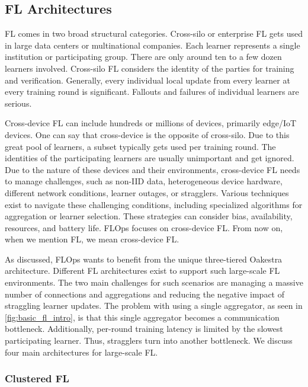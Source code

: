 \subsection{FL Architectures}

FL comes in two broad structural categories.
Cross-silo or enterprise FL gets used in large data centers or multinational companies.
Each learner represents a single institution or participating group.
There are only around ten to a few dozen learners involved.
Cross-silo FL considers the identity of the parties for training and verification.
Generally, every individual local update from every learner at every training round is significant.
Fallouts and failures of individual learners are serious.

Cross-device FL can include hundreds or millions of devices, primarily edge/IoT devices.
One can say that cross-device is the opposite of cross-silo.
Due to this great pool of learners, a subset typically gets used per training round.
The identities of the participating learners are usually unimportant and get ignored.
Due to the nature of these devices and their environments, cross-device FL
needs to manage challenges, such as non-IID data, heterogeneous device hardware,
different network conditions, learner outages, or stragglers.
Various techniques exist to navigate these challenging conditions,
including specialized algorithms for aggregation or learner selection.
These strategies can consider bias, availability, resources, and battery life.
FLOps focuses on cross-device FL.
From now on, when we mention FL, we mean cross-device FL.

As discussed, FLOps wants to benefit from the unique three-tiered Oakestra \cite{paper:oakestra_usenix} architecture.
Different FL architectures exist to support such large-scale FL environments.
The two main challenges for such scenarios are managing a massive number of connections and aggregations
and reducing the negative impact of straggling learner updates.
The problem with using a single aggregator, as seen in \ref{fig:basic_fl_intro}, is
that this single aggregator becomes a communication bottleneck.
Additionally, per-round training latency is limited by the slowest participating learner.
Thus, stragglers turn into another bottleneck.
We discuss four main architectures for large-scale FL.

\subsubsection{Clustered FL}

